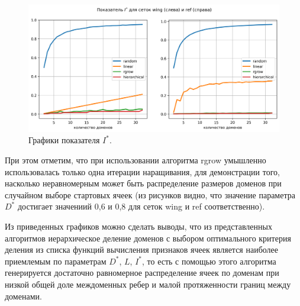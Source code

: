 \begin{figure}[H]
	\centering
	\includegraphics[width=1.0\textwidth]{./pics/text_2_decompsurf/qual_I_star.png}
	\caption{Графики показателя $I^{*}$.}
	\label{fig:text_2_decompsurf_qual_I_star}
\end{figure}

При этом отметим, что при использовании алгоритма rgrow умышленно использовалась только одна итерации наращивания, для демонстрации того, насколько неравномерным может быть распределение размеров доменов при случайном выборе стартовых ячеек (из рисунков видно, что значение параметра $D^{*}$ достигает значениий 0,6 и 0,8 для сеток wing и ref соответственно).

Из приведенных графиков можно сделать выводы, что из представленных алгоритмов иерархическое деление доменов с выбором оптимального критерия деления из списка функций вычисления признаков ячеек является наиболее приемлемым по параметрам $D^{*}$, $L$, $I^{*}$, то есть с помощью этого алгоритма генерируется достаточно равномерное распределение ячеек по доменам при низкой общей доле междоменных ребер и малой протяженности границ между доменами.
